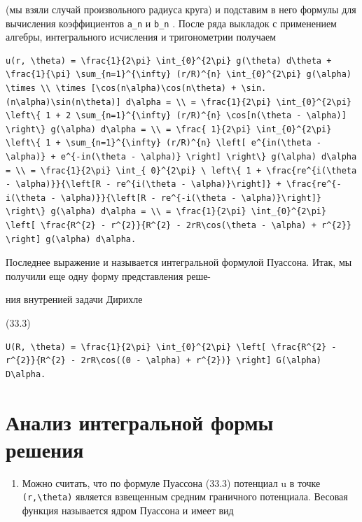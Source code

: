 \documentclass[
  ukrainian,
]{article}
\providecommand{\tightlist}{%
  \setlength{\itemsep}{0pt}\setlength{\parskip}{0pt}}
\begin{document}
(мы взяли случай произвольного радиуса круга) и подставим в него формулы
для вычисления коэффициентов \texttt{a\_n} и \texttt{b\_n} . После ряда
выкладок с применением алгебры, интегрального исчисления и тригонометрии
получаем

\begin{verbatim}
u(r, \theta) = \frac{1}{2\pi} \int_{0}^{2\pi} g(\theta) d\theta + \frac{1}{\pi} \sum_{n=1}^{\infty} (r/R)^{n} \int_{0}^{2\pi} g(\alpha) \times \\ \times [\cos(n\alpha)\cos(n\theta) + \sin. (n\alpha)\sin(n\theta)] d\alpha = \\ = \frac{1}{2\pi} \int_{0}^{2\pi} \left\{ 1 + 2 \sum_{n=1}^{\infty} (r/R)^{n} \cos[n(\theta - \alpha)] \right\} g(\alpha) d\alpha = \\ = \frac{ 1}{2\pi} \int_{0}^{2\pi} \left\{ 1 + \sum_{n=1}^{\infty} (r/R)^{n} \left[ e^{in(\theta - \alpha)} + e^{-in(\theta - \alpha)} \right] \right\} g(\alpha) d\alpha = \\ = \frac{1}{2\pi} \int_{ 0}^{2\pi} \ left\{ 1 + \frac{re^{i(\theta - \alpha)}}{\left[R - re^{i(\theta - \alpha)}\right]} + \frac{re^{-i(\theta - \alpha)}}{\left[R - re^{-i(\theta - \alpha)}\right]} \right\} g(\alpha) d\alpha = \\ = \frac{1}{2\pi} \int_{0}^{2\pi} \left[ \frac{R^{2} - r^{2}}{R^{2} - 2rR\cos(\theta - \alpha) + r^{2}} \right] g(\alpha) d\alpha.
\end{verbatim}

Последнее выражение и называется интегральной формулой Пуассона. Итак,
мы получили еще одну форму представления реше-

ния внутренией задачи Дирихле

(33.3)

\begin{verbatim}
U(R, \theta) = \frac{1}{2\pi} \int_{0}^{2\pi} \left[ \frac{R^{2} - r^{2}}{R^{2} - 2rR\cos((0 - \alpha) + r^{2})} \right] G(\alpha) D\alpha.
\end{verbatim}

\section{Анализ интегральной формы
решения}\label{ux430ux43dux430ux43bux438ux437-ux438ux43dux442ux435ux433ux440ux430ux43bux44cux43dux43eux439-ux444ux43eux440ux43cux44b-ux440ux435ux448ux435ux43dux438ux44f}

\begin{enumerate}
\def\labelenumi{\arabic{enumi}.}
\tightlist
\item
  Можно считать, что по формуле Пуассона (33.3) потенциал u в точке
  \texttt{(r,\textbackslash{}theta)} является взвещенным средним
  граничного потенциала. Весовая функция называется ядром Пуассона и
  имеет вид
\end{enumerate}
\end{document}
